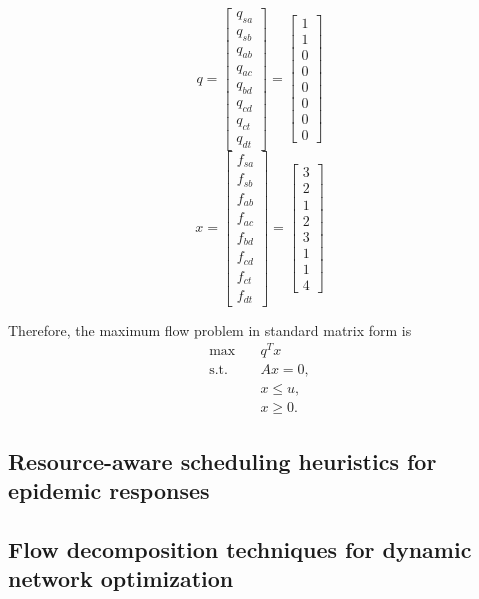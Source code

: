 \documentclass[12pt, openany]{article}
\begin{document}
\[
q=
\begin{bmatrix}
q_{sa} \\
q_{sb} \\
q_{ab} \\
q_{ac} \\
q_{bd} \\
q_{cd} \\
q_{ct} \\
q_{dt}
\end{bmatrix}
=
\begin{bmatrix}
1\\
1\\
0\\
0\\
0\\
0\\
0\\
0
\end{bmatrix}
\]
\[
x=
\begin{bmatrix}
f_{sa} \\
f_{sb} \\
f_{ab} \\
f_{ac} \\
f_{bd} \\
f_{cd} \\
f_{ct} \\
f_{dt}
\end{bmatrix}
=
\begin{bmatrix}
3\\
2\\
1\\
2\\
3\\
1\\
1\\
4
\end{bmatrix}
\]

Therefore, the maximum flow problem in standard matrix form is
\[
\begin{aligned}
\max \quad & q^T x \\
\text{s.t.} \quad & Ax = 0, \\
& x \le u, \\
& x \ge 0.
\end{aligned}
\]

\subsection{Resource-aware scheduling heuristics for epidemic responses}

\subsection{Flow decomposition techniques for dynamic network optimization}
\end{document}

